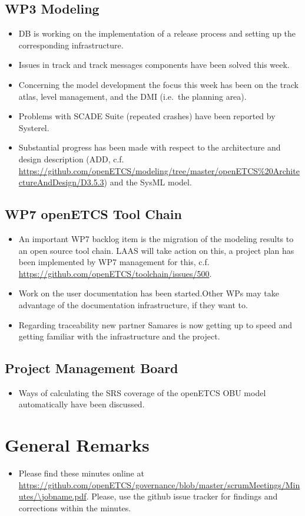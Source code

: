 \documentclass[a4paper, 11pt]{article}
\begin{document}
\subsection{WP3 Modeling}
\begin{itemize}
\item DB is working on the implementation of a release process and setting up the corresponding infrastructure.
\item Issues in track and track messages components have been solved this week.
\item Concerning the model development the focus this week has been on the track atlas, level management, and the DMI (i.e.~the planning area).
\item Problems with SCADE Suite (repeated crashes) have been reported by Systerel.
\item Substantial progress has been made with respect to the architecture and design description (ADD, c.f. \url{https://github.com/openETCS/modeling/tree/master/openETCS%20ArchitectureAndDesign/D3.5.3}) and the SysML model.
\end{itemize}

\subsection{WP7 openETCS Tool Chain}
\begin{itemize}
\item An important WP7 backlog item is the migration of the modeling results to an open source tool chain. LAAS will take action on this, a project plan has been implemented by WP7 management for this, c.f. \url{https://github.com/openETCS/toolchain/issues/500}.
\item Work on the user documentation has been started.Other WPs may take advantage of the documentation infrastructure, if they want to.
\item Regarding traceability new partner Samares is now getting up to speed and getting familiar with the infrastructure and the project.
\end{itemize}

\subsection{Project Management Board}
\begin{itemize}
\item Ways of calculating the SRS coverage of the openETCS OBU model automatically have been discussed.
\end{itemize}


\section{General Remarks}

\begin{itemize}
\item Please find these minutes online at \url{https://github.com/openETCS/governance/blob/master/scrumMeetings/Minutes/\jobname.pdf}. Please, use the github issue tracker for findings and corrections within the minutes.
\end{itemize}
\end{document}
